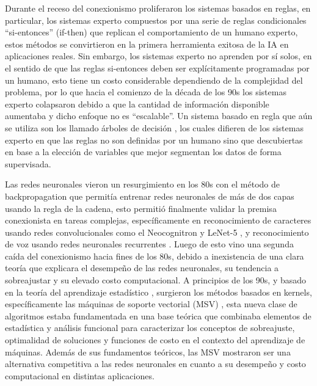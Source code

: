 Durante el receso del conexionismo proliferaron los sistemas basados en reglas, en particular, los sistemas experto compuestos por una serie de reglas condicionales “si-entonces” (if-then) que replican el comportamiento de un humano experto, estos métodos se convirtieron en la primera herramienta exitosa de la IA en aplicaciones reales. Sin embargo, los sistemas experto no aprenden por sí solos, en el sentido de que las reglas si-entonces deben ser explícitamente programadas por un humano, esto tiene un costo considerable dependiendo de la complejidad del problema, por lo que hacia el comienzo de la década de los 90s los sistemas experto colapsaron debido a que la cantidad de información disponible aumentaba y dicho enfoque no es “escalable”. Un sistema basado en regla que aún se utiliza son los llamado árboles de decisión \cite{breiman_1984}, los cuales difieren de los sistemas experto en que las reglas no son definidas por un humano sino que descubiertas en base a la elección de variables que mejor segmentan los datos de forma supervisada.

Las redes neuronales vieron un resurgimiento en los 80s con el método de backpropagation que permitía entrenar redes neuronales de más de dos capas usando la regla de la cadena, esto permitió finalmente validar la premisa conexionista en tareas complejas, específicamente en reconocimiento de caracteres usando redes convolucionales como el Neocognitron \cite{fukushima_1980} y LeNet-5 \cite{lecun_1989}, y reconocimiento de voz usando redes neuronales recurrentes \cite{hopfield_1982}. Luego de esto vino una segunda caída del conexionismo hacia fines de los 80s, debido a inexistencia de una clara teoría que explicara el desempeño de las redes neuronales, su tendencia a sobreajustar y su elevado costo computacional. A principios de los 90s, y basado en la teoría del aprendizaje estadístico \cite{vapnik_1971}, surgieron los métodos basados en kernels, específicamente las máquinas de soporte vectorial (MSV) \cite{boser_1992}, esta nueva clase de algoritmos estaba fundamentada en una base teórica que combinaba elementos de estadística y análisis funcional para caracterizar los conceptos de sobreajuste, optimalidad de soluciones y funciones de costo en el contexto del aprendizaje de máquinas. Además de sus fundamentos teóricos, las MSV mostraron ser una alternativa competitiva a las redes neuronales en cuanto a su desempeño y costo computacional en distintas aplicaciones. 

